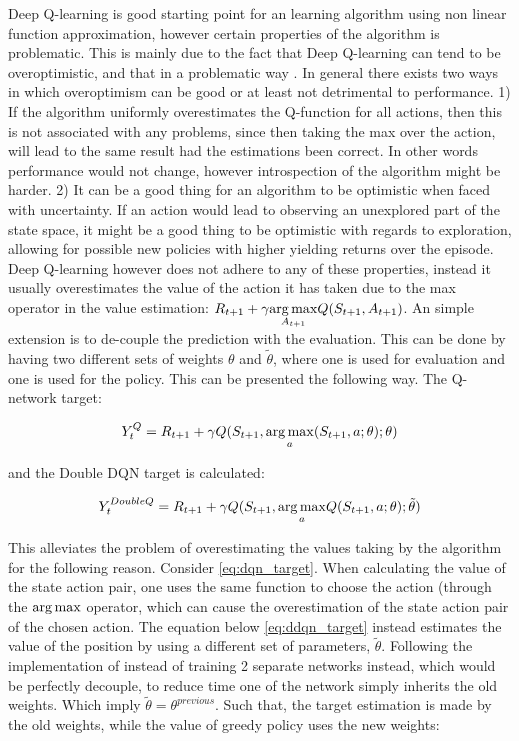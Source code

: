 Deep Q-learning is good starting point for an learning algorithm using non linear function approximation, however certain properties of the algorithm is problematic. This is mainly due to the fact that Deep Q-learning can tend to be overoptimistic, and that in a problematic way \parencite{van_hasselt_deep_2015}. In general there exists two ways in which overoptimism can be good or at least not detrimental to performance. 1) If the algorithm uniformly overestimates the Q-function for all actions, then this is not associated with any problems, since then taking the max over the action, will lead to the same result had the estimations been correct. In other words performance would not change, however introspection of the algorithm might be harder. 2) It can be a good thing for an algorithm to be optimistic when faced with uncertainty. If an action would lead to observing an unexplored part of the state space, it might be a good thing to be optimistic with regards to exploration, allowing for possible new policies with higher yielding returns over the episode. Deep Q-learning however does not adhere to any of these properties, instead it usually overestimates the value of the action it has taken due to the max operator in the value estimation: $R_{t+1} + \gamma \underset{A_{t+1}}{\operatorname*{arg\,max}} Q(S_{t+1}, A_{t+1})$. An simple extension \parencite{van_hasselt_deep_2015} is to de-couple the prediction with the evaluation. This can be done by having two different sets of weights $\theta$ and $\tilde{\theta}$, where one is used for evaluation and one is used for the policy. This can be presented the following way. The Q-network target:

\begin{equation}\label{eq:dqn_target}
    Y_t^{Q} = R_{t+1} + \gamma Q(S_{t+1}, \underset{a}{\operatorname*{arg\,max}} (S_{t+1}, a ; \theta) ; \theta)
\end{equation}

and the Double DQN target is calculated:

\begin{equation}\label{eq:ddqn_target}
    Y_t^{DoubleQ} = R_{t+1} + \gamma Q(S_{t+1}, \underset{a}{\operatorname*{arg\,max}}Q(S_{t+1}, a; \theta); \tilde{\theta}) 
\end{equation}

This alleviates the problem of overestimating the values taking by the algorithm for the following reason. Consider \eqref{eq:dqn_target}. When calculating the value of the state action pair, one uses the same function to choose the action (through the $\operatorname*{arg\,max}$ operator, which can cause the overestimation of the state action pair of the chosen action. The equation below \eqref{eq:ddqn_target} instead estimates the value of the position by using a different set of parameters, $\tilde{\theta}$. Following the implementation of \parencite{van_hasselt_deep_2015} instead of training 2 separate networks instead, which would be perfectly decouple, to reduce time one of the network simply inherits the old weights. Which imply $\tilde{\theta} = \theta^{previous}$. Such that, the target estimation is made by the old weights, while the value of greedy policy uses the new weights:

